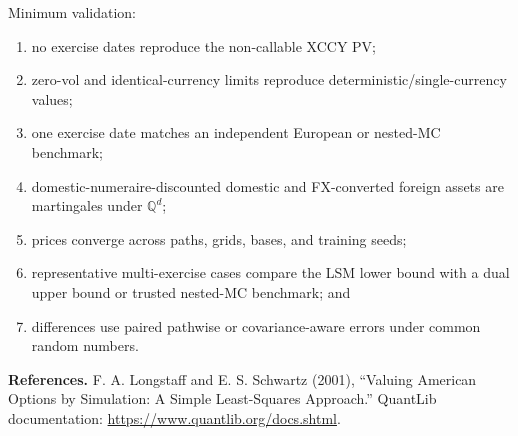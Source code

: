\documentclass[conference]{IEEEtran}
\newcommand{\Qd}{\mathbb{Q}^{d}}
\begin{document}
Minimum validation:
\begin{enumerate}
  \item no exercise dates reproduce the non-callable XCCY PV;
  \item zero-vol and identical-currency limits reproduce deterministic/single-currency values;
  \item one exercise date matches an independent European or nested-MC benchmark;
  \item domestic-numeraire-discounted domestic and FX-converted foreign assets are martingales under $\Qd$;
  \item prices converge across paths, grids, bases, and training seeds;
  \item representative multi-exercise cases compare the LSM lower bound with a dual upper bound or trusted nested-MC benchmark; and
  \item differences use paired pathwise or covariance-aware errors under common random numbers.
\end{enumerate}

\vspace{1pt}
\textbf{References.} F. A. Longstaff and E. S. Schwartz (2001), ``Valuing American Options by Simulation: A Simple Least-Squares Approach.'' QuantLib documentation: \url{https://www.quantlib.org/docs.shtml}.
\end{document}
